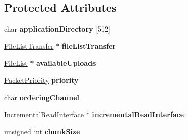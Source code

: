 \subsection*{Protected Attributes}
\begin{DoxyCompactItemize}
\item 
\hypertarget{class_rak_net_1_1_directory_delta_transfer_a709564202d2e571e75999ddc1d35edaf}{char {\bfseries application\-Directory} \mbox{[}512\mbox{]}}\label{class_rak_net_1_1_directory_delta_transfer_a709564202d2e571e75999ddc1d35edaf}

\item 
\hypertarget{class_rak_net_1_1_directory_delta_transfer_ad9ad3600da8b25c2941dcd2b34c39864}{\hyperlink{class_rak_net_1_1_file_list_transfer}{File\-List\-Transfer} $\ast$ {\bfseries file\-List\-Transfer}}\label{class_rak_net_1_1_directory_delta_transfer_ad9ad3600da8b25c2941dcd2b34c39864}

\item 
\hypertarget{class_rak_net_1_1_directory_delta_transfer_a0cb929bfc99c20a0bac8f907304f4ce7}{\hyperlink{class_rak_net_1_1_file_list}{File\-List} $\ast$ {\bfseries available\-Uploads}}\label{class_rak_net_1_1_directory_delta_transfer_a0cb929bfc99c20a0bac8f907304f4ce7}

\item 
\hypertarget{class_rak_net_1_1_directory_delta_transfer_a115f30a0fa9e7b26d65a1bfcfe189aca}{\hyperlink{_packet_priority_8h_a659378374e516180f93640c79f59705c}{Packet\-Priority} {\bfseries priority}}\label{class_rak_net_1_1_directory_delta_transfer_a115f30a0fa9e7b26d65a1bfcfe189aca}

\item 
\hypertarget{class_rak_net_1_1_directory_delta_transfer_a869a817f06ac1f191820b958a8881588}{char {\bfseries ordering\-Channel}}\label{class_rak_net_1_1_directory_delta_transfer_a869a817f06ac1f191820b958a8881588}

\item 
\hypertarget{class_rak_net_1_1_directory_delta_transfer_aabf3d192e7f8eb33c11714dc38f4cadd}{\hyperlink{class_rak_net_1_1_incremental_read_interface}{Incremental\-Read\-Interface} $\ast$ {\bfseries incremental\-Read\-Interface}}\label{class_rak_net_1_1_directory_delta_transfer_aabf3d192e7f8eb33c11714dc38f4cadd}

\item 
\hypertarget{class_rak_net_1_1_directory_delta_transfer_a49a08515a494e7540f829af6f99e45e6}{unsigned int {\bfseries chunk\-Size}}\label{class_rak_net_1_1_directory_delta_transfer_a49a08515a494e7540f829af6f99e45e6}

\end{DoxyCompactItemize}


